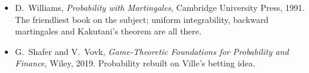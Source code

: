 \begin{itemize}
to the law of the iterated logarithm'', \emph{Ann.\ Math.\ Statist.}\ 41 (1970), 1397--1409. S.~R.~Howard, A.~Ramdas, J.~McAuliffe and J.~Sekhon, ``Time-uniform, nonparametric, nonasymptotic confidence sequences'',
\emph{Ann.\ Statist.}\ 49 (2021), 1055--1080. A.~Ramdas, P.~Gr\"unwald, V.~Vovk and G.~Shafer, ``Game-theoretic statistics and safe anytime-valid inference'', \emph{Statist.\ Sci.}\ 38 (2023), 576--601.
\item D.~Williams, \emph{Probability with Martingales}, Cambridge University Press, 1991. The friendliest book on the subject; uniform integrability, backward martingales and Kakutani's theorem are all there.
\item G.~Shafer and V.~Vovk, \emph{Game-Theoretic Foundations for Probability and Finance}, Wiley, 2019. Probability rebuilt on Ville's betting idea.
\end{itemize}
